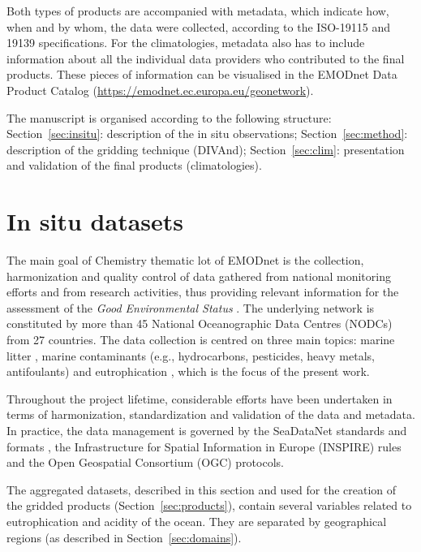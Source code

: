 \documentclass[essd, manuscript]{copernicus}
\begin{document}
Both types of products are accompanied with metadata, which indicate how, when and by whom, the data were collected, according to the ISO-19115 and 19139 specifications. For the climatologies, metadata also has to include information about all the individual data providers who contributed to the final products. These pieces of information can be visualised in the EMODnet Data Product Catalog (\url{https://emodnet.ec.europa.eu/geonetwork}).

The manuscript is organised according to the following structure: Section~\ref{sec:insitu}: description of the in situ observations; Section~\ref{sec:method}: description of the gridding technique (DIVAnd); Section~\ref{sec:clim}: presentation and validation of the final products (climatologies). 


\section{In situ datasets\label{sec:insitu}}

The main goal of Chemistry thematic lot of EMODnet is the collection, harmonization and quality control of data gathered from national monitoring efforts and from research activities, thus providing relevant information for the assessment of the \textit{Good Environmental Status} \citep[GES,][]{Vinci2017}. The underlying network is constituted by more than 45 National Oceanographic Data Centres (NODCs) from 27 countries. The data collection is centred on three main topics: marine litter \citep{Vinci2018}, marine contaminants (e.g., hydrocarbons, pesticides, heavy metals, antifoulants) and eutrophication \citep{Giorgetti2020}, which is the focus of the present work. 

Throughout the project lifetime, considerable efforts have been undertaken in terms of harmonization, standardization and validation of the data and metadata. In practice, the data management is governed by the SeaDataNet standards and formats \citep{Schaap2010}, the Infrastructure for Spatial Information in Europe (INSPIRE) rules and the Open Geospatial Consortium (OGC) protocols. 

The aggregated datasets, described in this section and used for the creation of the gridded products (Section~\ref{sec:products}), contain several variables related to eutrophication and acidity of the ocean. They are separated by geographical regions (as described in Section~\ref{sec:domains}).
\end{document}
